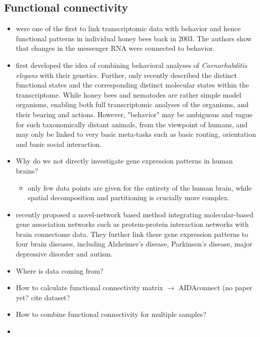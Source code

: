 \documentclass[]{article}
\renewcommand{\cite}{\citep}
\begin{document}
\subsection*{Functional connectivity}
\begin{itemize}
	\item \cite{whitfield2003gene} were one of the first to link transcriptomic data with behavior and hence functional patterns in individual honey bees back in 2003. The authors show that changes in the messenger RNA were connected to behavior.
	\item \cite{rankin2002gene} first developed the idea of combining behavioral analyses of \textit{Caenorhabditis elegans} with their genetics. Further, \cite{sun2021temporal} only recently described the distinct functional states and the corresponding distinct molecular states within the transcriptome. While honey bees and nematodes are rather simple model organisms, enabling both full transcriptomic analyses of the organisms, and their bearing and actions. However, "behavior" may be ambiguous and vague for such taxonomically distant animals, from the viewpoint of humans, and may only be linked to very basic meta-tasks such as basic routing, orientation and basic social interaction. 
	\item Why do we not directly investigate gene expression patterns in human brains?
	\begin{itemize}
		\item only few data points are given for the entirety of the human brain, while spatial decomposition and partitioning is crucially more complex. 
	\end{itemize}
	\item \cite{wang2022network} recently proposed a novel-network based method integrating molecular-based gene association networks such as protein-protein interaction networks with brain connectome data. They further link these gene expression patterns to four brain diseases, including Alzheimer’s disease, Parkinson’s disease, major depressive disorder and autism.
\end{itemize}
\begin{itemize}
	\item Where is data coming from? \cite{AIDAmri2019}
	\item How to calculate functional connectivity matrix $\rightarrow$ AIDAconnect (no paper yet? cite dataset?
	\item How to combine functional connectivity for multiple samples? 
	\item \cite{Zerbi2021}
\end{itemize}
\end{document}
